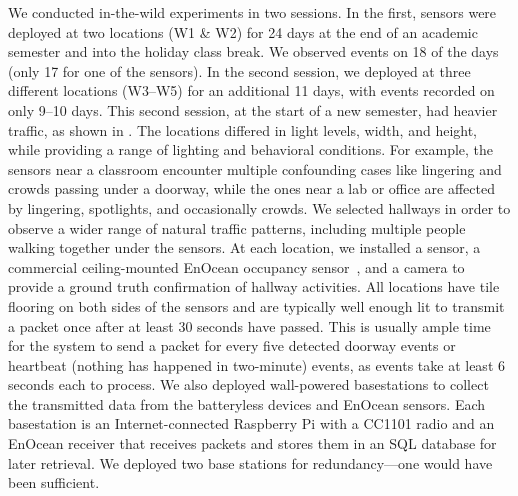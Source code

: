 We conducted in-the-wild experiments in two sessions. In the first, sensors were deployed at two locations (W1 \& W2) for 24 days at the end of an academic semester and into the holiday class break.
We observed events on 18 of the days (only 17 for one of the sensors). 
In the second session, we deployed at three different locations (W3--W5) for an additional 11 days, with events recorded on only 9--10 days. This second session, at the start of a new semester, had heavier traffic, as shown in .
The locations differed in light levels, width, and height, while providing a range of lighting and behavioral conditions. 
For example, the sensors near a classroom encounter multiple confounding cases like lingering and crowds passing under a doorway, while the ones near a lab or office are affected by lingering, spotlights, and occasionally crowds.
We selected hallways in order to observe a wider range of natural traffic patterns, including multiple people walking together under the sensors. 
At each location, we installed a \sysname sensor, a commercial ceiling-mounted EnOcean occupancy sensor~\cite{EnOcean}, and a camera to provide a ground truth confirmation of hallway activities. %
All locations have tile flooring on both sides of the sensors and are typically well enough lit to transmit a packet once after at least 30 seconds have passed.  This is usually ample time for the system to send a packet for every five detected doorway events or heartbeat (nothing has happened in two-minute) events, as events take at least 6 seconds each to process. 
We also deployed wall-powered basestations to collect the transmitted data from the batteryless \sysname devices and EnOcean sensors.
Each basestation is an Internet-connected Raspberry Pi with a CC1101 radio and an EnOcean receiver that receives packets and stores them in an SQL database for later retrieval. 
We deployed two base stations for redundancy---one would have been sufficient.   

